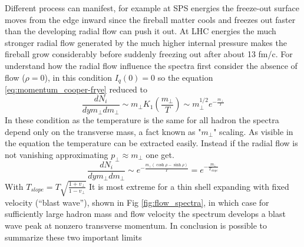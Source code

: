 \documentclass[12pt,a4paper]{book}
\begin{document}
	Different process can manifest, for example	at SPS energies the freeze-out surface moves from the edge inward since the fireball matter cools and freezes out faster than the developing radial flow can push it out. At LHC energies the much stronger radial flow generated by the much higher internal pressure makes the fireball grow considerably before suddenly freezing out after about 13 fm/c. 
	For understand how the radial flow influence the spectra first consider the absence of flow ($\rho=0$), in this condition $I_q(0)=0$ so the equation \ref{eq:momentum_cooper-frye} reduced to
	\begin{equation}
		\frac{dN_i}{dy m_\perp dm_\perp} \sim m_\perp K_1	\left(\frac{m_\perp}{T}\right) \sim m_\perp^{1/2} e^{- \frac{m_\perp}{T}}
		\label{eq:vanish_rad_flow}
	\end{equation}
	In these condition as the temperature is the same for all hadron the spectra depend only on the transverse mass, a fact known as "$m_\perp$" scaling. As visible in the equation the temperature can be extracted easily. Instead if the radial flow is not vanishing approximating $p_\perp \approx m_\perp$ one get.
	\begin{equation}
		\frac{dN_i}{dy m_\perp dm_\perp} \sim  e^{- \frac{m_\perp (\cosh \rho - \sinh \rho)}{T}} =  e^{- \frac{m_\perp}{T_{slope}}}
		\label{eq:no_vanish_rad_flow}
	\end{equation}
	With $T_{slope} = T \sqrt{\frac{1+v_\perp}{1-v_\perp}}$ It is most extreme for a thin shell expanding with fixed velocity (“blast wave”), shown in Fig \ref{fig:flow_spectra}, in which case for sufficiently large hadron mass and flow velocity the spectrum develops a blast wave peak at nonzero transverse momentum. In conclusion is possible to summarize these two important limits
	
\end{document}
